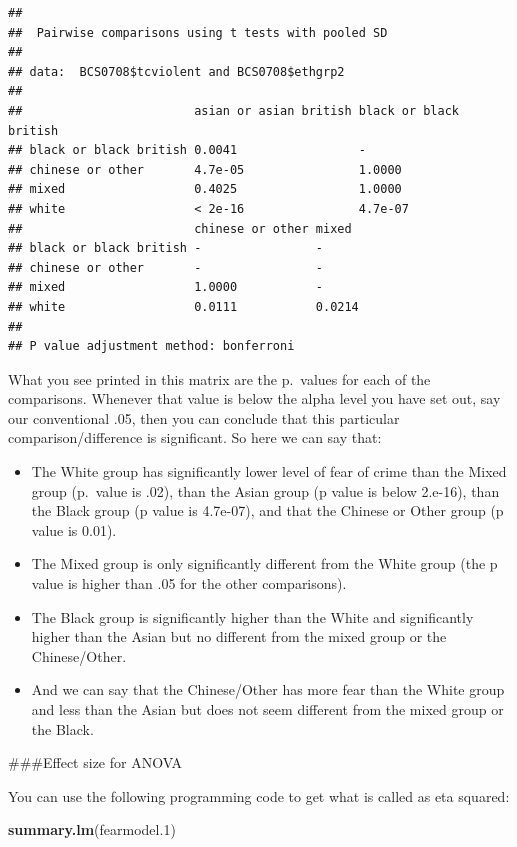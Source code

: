 \documentclass[]{book}
\newenvironment{Shaded}{\begin{snugshade}}{\end{snugshade}}
\newcommand{\FloatTok}[1]{\textcolor[rgb]{0.00,0.00,0.81}{#1}}
\newcommand{\KeywordTok}[1]{\textcolor[rgb]{0.13,0.29,0.53}{\textbf{#1}}}
\newcommand{\NormalTok}[1]{#1}
\theoremstyle{definition}
\theoremstyle{definition}
\theoremstyle{definition}
\theoremstyle{remark}
\begin{document}
\begin{verbatim}
## 
##  Pairwise comparisons using t tests with pooled SD 
## 
## data:  BCS0708$tcviolent and BCS0708$ethgrp2 
## 
##                        asian or asian british black or black british
## black or black british 0.0041                 -                     
## chinese or other       4.7e-05                1.0000                
## mixed                  0.4025                 1.0000                
## white                  < 2e-16                4.7e-07               
##                        chinese or other mixed 
## black or black british -                -     
## chinese or other       -                -     
## mixed                  1.0000           -     
## white                  0.0111           0.0214
## 
## P value adjustment method: bonferroni
\end{verbatim}

What you see printed in this matrix are the p.~values for each of the
comparisons. Whenever that value is below the alpha level you have set
out, say our conventional .05, then you can conclude that this
particular comparison/difference is significant. So here we can say
that:

\begin{itemize}
\item
  The White group has significantly lower level of fear of crime than
  the Mixed group (p.~value is .02), than the Asian group (p value is
  below 2.e-16), than the Black group (p value is 4.7e-07), and that the
  Chinese or Other group (p value is 0.01).
\item
  The Mixed group is only significantly different from the White group
  (the p value is higher than .05 for the other comparisons).
\item
  The Black group is significantly higher than the White and
  significantly higher than the Asian but no different from the mixed
  group or the Chinese/Other.
\item
  And we can say that the Chinese/Other has more fear than the White
  group and less than the Asian but does not seem different from the
  mixed group or the Black.
\end{itemize}

\#\#\#Effect size for ANOVA

You can use the following programming code to get what is called as eta
squared:

\begin{Shaded}
\begin{Highlighting}[]
\KeywordTok{summary.lm}\NormalTok{(fearmodel}\FloatTok{.1}\NormalTok{) }
\end{Highlighting}
\end{Shaded}
\end{document}

